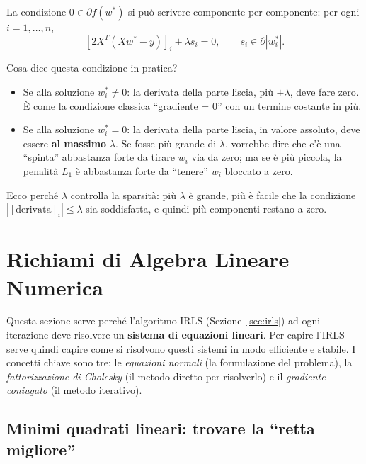 \documentclass[a4paper,11pt]{article}
\theoremstyle{definition}
\begin{document}
La condizione $0 \in \partial f(w^*)$ si può scrivere componente per componente: per ogni $i = 1, \ldots, n$,
\begin{equation}\label{eq:opt_cond}
  [2X^T(Xw^* - y)]_i + \lambda s_i = 0, \qquad s_i \in \partial |w^*_i|.
\end{equation}

\begin{intuizione}
Cosa dice questa condizione in pratica?
\begin{itemize}[nosep]
  \item Se alla soluzione $w^*_i \neq 0$: la derivata della parte liscia, più $\pm\lambda$, deve fare zero. È come la condizione classica ``gradiente = 0'' con un termine costante in più.
  \item Se alla soluzione $w^*_i = 0$: la derivata della parte liscia, in valore assoluto, deve essere \textbf{al massimo} $\lambda$. Se fosse più grande di $\lambda$, vorrebbe dire che c'è una ``spinta'' abbastanza forte da tirare $w_i$ via da zero; ma se è più piccola, la penalità $L_1$ è abbastanza forte da ``tenere'' $w_i$ bloccato a zero.
\end{itemize}
Ecco perché $\lambda$ controlla la sparsità: più $\lambda$ è grande, più è facile che la condizione $|[\text{derivata}]_i| \leq \lambda$ sia soddisfatta, e quindi più componenti restano a zero.
\end{intuizione}

\section{Richiami di Algebra Lineare Numerica}
\label{sec:nla}

\begin{intuizione}
Questa sezione serve perché l'algoritmo IRLS (Sezione~\ref{sec:irls}) ad ogni iterazione deve risolvere un \textbf{sistema di equazioni lineari}. Per capire l'IRLS serve quindi capire come si risolvono questi sistemi in modo efficiente e stabile. I concetti chiave sono tre: le \emph{equazioni normali} (la formulazione del problema), la \emph{fattorizzazione di Cholesky} (il metodo diretto per risolverlo) e il \emph{gradiente coniugato} (il metodo iterativo).
\end{intuizione}

\subsection{Minimi quadrati lineari: trovare la ``retta migliore''}
\label{subsec:leastsquares}
\end{document}
